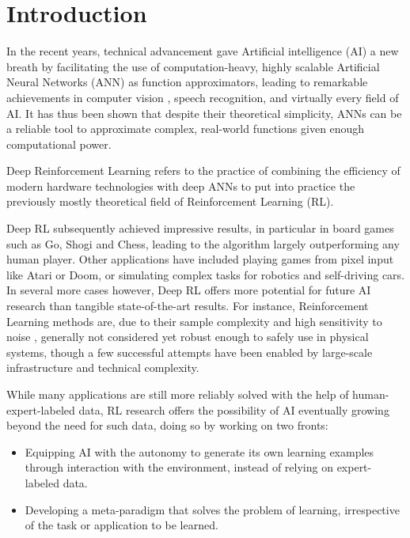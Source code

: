\section{Introduction}
\label{sec:intro}
In the recent years, technical advancement gave Artificial intelligence (AI) a new breath by facilitating the use of computation-heavy, highly scalable Artificial Neural Networks (ANN) as function approximators, leading to remarkable achievements in computer vision \cite{krizhevsky2012imagenet}, speech recognition\cite{dahl2011context}, and virtually every field of AI. It has thus been shown that despite their theoretical simplicity, ANNs can be a reliable tool to approximate complex, real-world functions given enough computational power. %


Deep Reinforcement Learning refers to the practice of combining the efficiency of modern hardware technologies with deep ANNs to put into practice the previously mostly theoretical field of Reinforcement Learning (RL). 

Deep RL subsequently achieved impressive results, in particular in board games such as Go, Shogi and Chess\cite{silver2018general}, leading to the algorithm largely outperforming any human player. Other applications have included playing games from pixel input like Atari\cite{mnih2015human} or Doom\cite{kempka2016vizdoom}, or simulating complex tasks for robotics\cite{levine2016end} and self-driving cars\cite{pan2017virtual}. In several more cases however, Deep RL offers more potential for future AI research than tangible state-of-the-art results. For instance, Reinforcement Learning methods are, due to their sample complexity and high sensitivity to noise\cite{henderson2018deep} \cite{engstrom2020implementation} \cite{dossa2021empirical}, generally not considered yet robust enough to safely use in physical systems, though a few successful attempts have been enabled by large-scale infrastructure and technical complexity. \cite{andrychowicz2020learning}

While many applications are still more reliably solved with the help of human-expert-labeled data,  RL research offers the possibility of AI eventually growing beyond the need for such data, doing so by working on two fronts:
\begin{itemize}
\item Equipping AI with the autonomy to generate its own learning examples through interaction with the environment, instead of relying on expert-labeled data.
\item Developing a meta-paradigm that solves the problem of learning, irrespective of the task or application to be learned.
\end{itemize}

